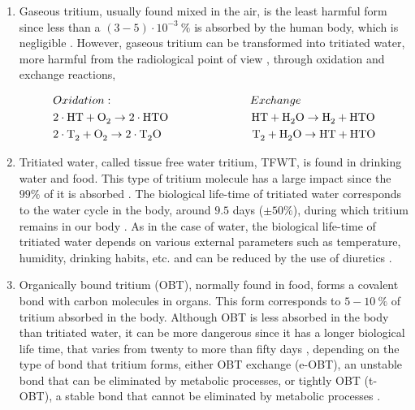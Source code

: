 \begin{enumerate}
\item{} Gaseous tritium, usually found mixed in the air, is the least harmful form since less than a $(3-5) \cdot{} 10^{-3}~\%$ is absorbed by the human body, which is negligible \cite{TritiumHandling}. However, gaseous tritium can be transformed into tritiated water, more harmful from the radiological point of view \cite{TritiumHandling}, through oxidation and exchange reactions,

\begin{equation}
\begin{split}
& Oxidation: \qquad \qquad \qquad \qquad \qquad \qquad Exchange\\
& 2\cdot{}\ce{HT} + \ce{O_2} \rightarrow 2 \cdot{} \ce{HTO} ~ \quad \qquad \qquad \qquad \ce{HT} + \ce{H_2 O} \rightarrow \ce{H_2} + \ce{HTO}\\
& 2\cdot{}\ce{T_2} + \ce{O_2} \rightarrow 2 \cdot{} \ce{T_2 O} \qquad \qquad \qquad \qquad \ce{T_2} + \ce{H_2 O} \rightarrow \ce{HT} + \ce{HTO}
\label{eq:OxidationExchange}
\end{split}
\end{equation}

\item{} Tritiated water, called tissue free water tritium, TFWT, is found in drinking water and food. This type of tritium molecule has a large impact since the $99\%$ of it is absorbed \cite{TritiumHandling}. The biological life-time of tritiated water corresponds to the water cycle in the body, around $9.5$ days ($\pm50\%$), during which tritium remains in our body \cite{TritiumHandling, FranceTritiumEnvironment, EstimationTritiumDosi, TissueDistribution}. As in the case of water, the biological life-time of tritiated water depends on various external parameters such as temperature, humidity, drinking habits, etc. and can be reduced by the use of diuretics \cite{TritiumHandling}.

\item{} Organically bound tritium (OBT), normally found in food, forms a covalent bond with carbon molecules in organs. This form corresponds to $5-10~\%$ of tritium absorbed in the body. Although OBT is less absorbed in the body than tritiated water, it can be more dangerous since it has a longer biological life time, that varies from twenty to more than fifty days \cite{EstimationTritiumDosiKangarooRats, TissueDistribution}, depending on the type of bond that tritium forms, either OBT exchange (e-OBT), an unstable bond that can be eliminated by metabolic processes, or tightly OBT (t-OBT), a stable bond that cannot be eliminated by metabolic processes \cite{FranceTritiumEnvironment, EstimationTritiumDosi, EstimationTritiumDosiRats, EstimationTritiumDosiKangarooRats}.
\end{enumerate}

